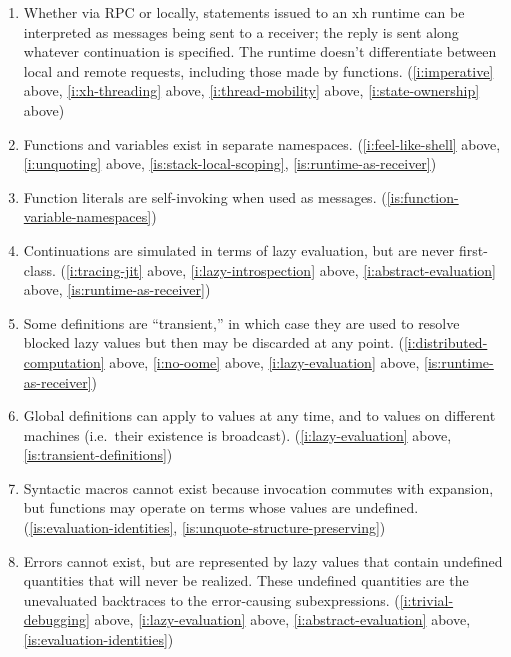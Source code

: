 \documentclass{report}
\begin{document}
\begin{enumerate}
\item{}\label{is:runtime-as-receiver}
  Whether via RPC or locally, statements issued to an xh runtime can be
  interpreted as messages being sent to a receiver; the reply is sent along
  whatever continuation is specified. The runtime doesn't differentiate
  between local and remote requests, including those made by functions.
    (\ref{i:imperative} above,
     \ref{i:xh-threading} above,
     \ref{i:thread-mobility} above,
     \ref{i:state-ownership} above)
\item{}\label{is:function-variable-namespaces}
  Functions and variables exist in separate namespaces.
    (\ref{i:feel-like-shell} above,
     \ref{i:unquoting} above,
     \ref{is:stack-local-scoping},
     \ref{is:runtime-as-receiver})
\item{}\label{is:function-literals-as-messages}
  Function literals are self-invoking when used as messages.
    (\ref{is:function-variable-namespaces})
\item{}\label{is:no-real-continuations}
  Continuations are simulated in terms of lazy evaluation, but are never
  first-class.
    (\ref{i:tracing-jit} above,
     \ref{i:lazy-introspection} above,
     \ref{i:abstract-evaluation} above,
     \ref{is:runtime-as-receiver})
\item{}\label{is:transient-definitions}
  Some definitions are ``transient,'' in which case they are used to
  resolve blocked lazy values but then may be discarded at any point.
    (\ref{i:distributed-computation} above,
     \ref{i:no-oome} above,
     \ref{i:lazy-evaluation} above,
     \ref{is:runtime-as-receiver})
\item{}\label{is:global-definition-universality}
  Global definitions can apply to values at any time, and to values on
  different machines (i.e.~their existence is broadcast).
    (\ref{i:lazy-evaluation} above,
     \ref{is:transient-definitions})

\item{}\label{is:macros-cannot-exist}
  Syntactic macros cannot exist because invocation commutes with expansion,
  but functions may operate on terms whose values are undefined.
    (\ref{is:evaluation-identities},
     \ref{is:unquote-structure-preserving})
\item{}\label{is:errors-cannot-exist}
  Errors cannot exist, but are represented by lazy values that contain
  undefined quantities that will never be realized. These undefined
  quantities are the unevaluated backtraces to the error-causing
  subexpressions.
    (\ref{i:trivial-debugging} above,
     \ref{i:lazy-evaluation} above,
     \ref{i:abstract-evaluation} above,
     \ref{is:evaluation-identities})
\end{enumerate}
\end{document}
